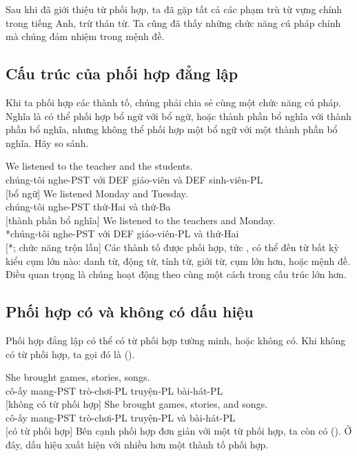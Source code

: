 Sau khi đã giới thiệu từ phối hợp, ta đã gặp tất cả các phạm trù từ vựng chính trong tiếng Anh, trừ thán từ. Ta cũng đã thấy những chức năng cú pháp chính mà chúng đảm nhiệm trong mệnh đề.

\subsection{Cấu trúc của phối hợp đẳng lập}

Khi ta phối hợp các thành tố, chúng phải chia sẻ cùng một chức năng cú pháp. Nghĩa là có thể phối hợp bổ ngữ với bổ ngữ, hoặc thành phần bổ nghĩa với thành phần bổ nghĩa, nhưng không thể phối hợp một bổ ngữ với một thành phần bổ nghĩa. Hãy so sánh.

\ea \label{ex:coord-function-vi}
    \ea \gll We listened {\ob}to the teacher{\cb} {\ob}and the students{\cb}.\\
        chúng-tôi nghe-PST với DEF giáo-viên và DEF sinh-viên-PL\\
    \glt {} [bổ ngữ]
    \ex \gll We listened {\ob}Monday{\cb} and {\ob}Tuesday{\cb}.\\
        chúng-tôi nghe-PST thứ-Hai và thứ-Ba\\
    \glt {} [thành phần bổ nghĩa]
    \ex \gll *We listened {\ob}to the teachers{\cb} and {\ob}Monday{\cb}.\\
        *chúng-tôi nghe-PST với DEF giáo-viên-PL và thứ-Hai\\
    \glt {} [*; chức năng trộn lẫn]
    \z
\z
Các thành tố được phối hợp, tức , có thể đến từ bất kỳ kiểu cụm lớn nào: danh từ, động từ, tính từ, giới từ, cụm lớn hơn, hoặc mệnh đề. Điều quan trọng là chúng hoạt động theo cùng một cách trong cấu trúc lớn hơn.

\subsection{Phối hợp có và không có dấu hiệu}

Phối hợp đẳng lập có thể có từ phối hợp tường minh, hoặc không có. Khi không có từ phối hợp, ta gọi đó là  ().

\ea \label{ex:coord-marking-vi}
    \ea \gll She brought {\ob}games{\cb}, {\ob}stories{\cb}, {\ob}songs{\cb}.\\
        cô-ấy mang-PST trò-chơi-PL truyện-PL bài-hát-PL\\
    \glt {} [không có từ phối hợp]
    \ex \gll She brought {\ob}games{\cb}, {\ob}stories{\cb}, and {\ob}songs{\cb}.\\
        cô-ấy mang-PST trò-chơi-PL truyện-PL và bài-hát-PL\\
    \glt {} [có từ phối hợp]
    \z
\z
Bên cạnh phối hợp đơn giản với một từ phối hợp, ta còn có  (). Ở đây, dấu hiệu xuất hiện với nhiều hơn một thành tố phối hợp.

